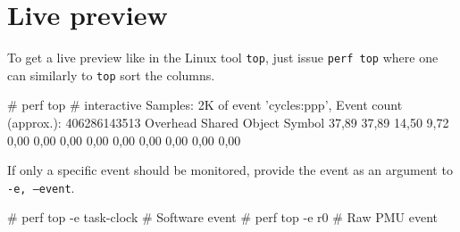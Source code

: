 \section{Live preview}

To get a live preview like in the Linux tool {\tt top}, just issue {\tt perf
top} where one can similarly to {\tt top} sort the columns.

\starttyping
# perf top # interactive
Samples: 2K of event 'cycles:ppp', Event count (approx.): 406286143513
Overhead  Shared Object                     Symbol
  37,89%
  37,89%
  14,50%
   9,72%
   0,00%
   0,00%
   0,00%
   0,00%
   0,00%
   0,00%
   0,00%
   0,00%
   0,00%
\stoptyping

If only a specific event should be monitored, provide the event as an
argument to {\tt -e, --event}.

\starttyping
# perf top -e task-clock # Software event
# perf top -e r0         # Raw PMU event
\stoptyping
